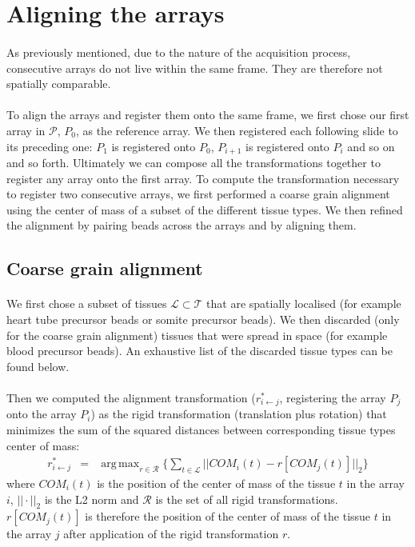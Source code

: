\documentclass[10pt,a4paper]{article}
\DeclareMathOperator*{\argmax}{arg\,max}
\begin{document}
\section{Aligning the arrays}
\paragraph{}As previously mentioned, due to the nature of the acquisition process, consecutive arrays do not live within the same frame.
They are therefore not spatially comparable.
\paragraph{}To align the arrays and register them onto the same frame, we first chose our first array in \(\mathcal{P}\), \(P_0\), as the reference array.
We then registered each following slide to its preceding one: \(P_1\) is registered onto \(P_0\), \(P_{i+1}\) is registered onto \(P_{i}\) and so on and so forth.
Ultimately we can compose all the transformations together to register any array onto the first array.
To compute the transformation necessary to register two consecutive arrays, we first performed a coarse grain alignment using the center of mass of a subset of the different tissue types.
We then refined the alignment by pairing beads across the arrays and by aligning them.
\subsection{Coarse grain alignment}
\paragraph{}We first chose a subset of tissues \(\mathcal{L}\subset\mathcal{T}\) that are spatially localised (for example heart tube precursor beads or somite precursor beads).
We then discarded (only for the coarse grain alignment) tissues that were spread in space (for example blood precursor beads).
An exhaustive list of the discarded tissue types can be found below.
\paragraph{}Then we computed the alignment transformation (\(r_{i\leftarrow j}^*\), registering the array \(P_j\) onto the array \(P_i\)) as the rigid transformation (translation plus rotation) that minimizes the sum of the squared distances between corresponding tissue types center of mass:
\begin{eqnarray}\label{eq:rigid}
r_{i\leftarrow j}^*&=&\argmax_{r\in\mathcal{R}} \big\{\sum_{t\in \mathcal{L}}||COM_i(t)-r[COM_j(t)]||_2\big\}
\end{eqnarray}
where \(COM_i(t)\) is the position of the center of mass of the tissue \(t\) in the array \(i\), \(||\cdot||_2\) is the L2 norm and \(\mathcal{R}\) is the set of all rigid transformations.
\(r[COM_j(t)]\) is therefore the position of the center of mass of the tissue \(t\) in the array \(j\) after application of the rigid transformation \(r\).
\end{document}
